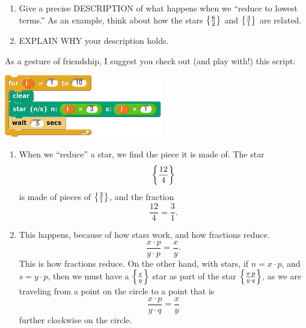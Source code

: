 \documentclass[noauthor,nooutcomes,12pt,hints,handout]{ximera}
\begin{document}
\begin{question}
  \begin{enumerate}
  \item Give a precise DESCRIPTION of what happens when we ``reduce to
    lowest terms.'' As an example, think about how the stars
    $\left\{\frac{6}{2}\right\}$ and $\left\{\frac{3}{1}\right\}$ are related.
  \item EXPLAIN WHY your description holds.
  \end{enumerate}
  As a gesture of friendship, I suggest you check out (and play with!)
  this script:
  \begin{center}
    \includegraphics{starSeq.png}
  \end{center}
  \begin{freeResponse}
    \begin{enumerate}
      \item When we ``reduce'' a star, we find the piece it is made
        of.  The star
        \[
        \left\{\frac{12}{4}\right\}
        \]
        is made of pieces of $\left\{\frac{3}{1}\right\}$, and the fraction
        \[
        \frac{12}{4} = \frac{3}{1}.
        \]
      \item This happens, because of how stars work, and how fractions reduce.
        \[
        \frac{x\cdot p}{y\cdot p} =  \frac{x}{y}.
        \]
        This is how fractions reduce. On the other hand, with stars,
        if $n=x\cdot p$, and $s=y\cdot p$, then we must have a
        $\left\{\frac{x}{y}\right\}$ star as part of the star
        $\left\{\frac{x\cdot p}{y\cdot q}\right\}$, as we are traveling from a
        point on the circle to a point that is
        \[
        \frac{x\cdot p}{y\cdot q} =  \frac{x}{y}
        \]
        further clockwise on the circle.
    \end{enumerate}
  \end{freeResponse}
\end{question}

\mynewpage
\end{document}
